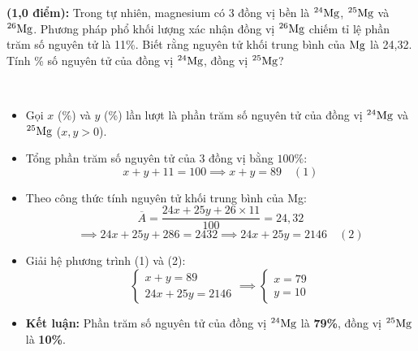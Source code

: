 \documentclass[12pt,a4paper]{article}
\renewcommand{\loigiai}[1]{%
  \par\smallskip\noindent{\color{blue!80!black}\textbf{Lời giải:}}\ #1\par\smallskip
}
\begin{document}
\begin{ex}
\textbf{(1,0 điểm):} Trong tự nhiên, magnesium có 3 đồng vị bền là $^{24}\ce{Mg}$, $^{25}\ce{Mg}$ và $^{26}\ce{Mg}$. Phương pháp phổ khối lượng xác nhận đồng vị $^{26}\ce{Mg}$ chiếm tỉ lệ phần trăm số nguyên tử là 11\%. Biết rằng nguyên tử khối trung bình của $\ce{Mg}$ là 24,32. Tính \% số nguyên tử của đồng vị $^{24}\ce{Mg}$, đồng vị $^{25}\ce{Mg}$?

\loigiai{
\begin{itemize}
	\item Gọi $x$ (\%) và $y$ (\%) lần lượt là phần trăm số nguyên tử của đồng vị $^{24}\ce{Mg}$ và $^{25}\ce{Mg}$ ($x, y > 0$).
	\item Tổng phần trăm số nguyên tử của 3 đồng vị bằng $100\%$:
	\[x + y + 11 = 100 \implies x + y = 89 \quad (1)\]
	\item Theo công thức tính nguyên tử khối trung bình của Mg:
	\[\overline{A} = \dfrac{24x + 25y + 26 \times 11}{100} = 24{,}32\]
	\[\implies 24x + 25y + 286 = 2432 \implies 24x + 25y = 2146 \quad (2)\]
	\item Giải hệ phương trình (1) và (2):
	\[\begin{cases} x + y = 89 \\ 24x + 25y = 2146 \end{cases} \implies \begin{cases} x = 79 \\ y = 10 \end{cases}\]
	\item \textbf{Kết luận:} Phần trăm số nguyên tử của đồng vị $^{24}\ce{Mg}$ là \textbf{79\%}, đồng vị $^{25}\ce{Mg}$ là \textbf{10\%}.
\end{itemize}
}
\end{ex}
\end{document}
